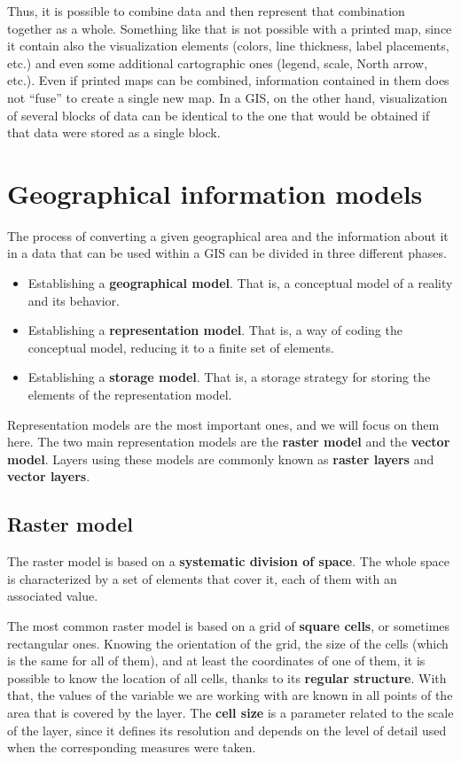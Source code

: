 Thus, it is possible to combine data and then represent that combination together as a whole. Something like that is not possible with a printed map, since it contain also the visualization elements (colors, line thickness, label placements, etc.) and even some additional cartographic ones (legend, scale, North arrow, etc.). Even if printed maps can be combined, information contained in them does not ``fuse'' to create a single new map. In a GIS, on the other hand, visualization of several blocks of data can be identical to the one that would be obtained if that data were stored as a single block.


\section{Geographical information models}

The process of converting a given geographical area and the information about it in a data that can be used within a GIS can be divided in three different phases.

\begin{itemize}
 \item Establishing a \textbf{geographical model}. That is, a conceptual model of a reality and its behavior.
\item Establishing a \textbf{representation model}. That is, a way of coding the conceptual model, reducing it to a finite set of elements.
\item Establishing a \textbf{storage model}. That is, a storage strategy for storing the elements of the representation model.
\end{itemize}

Representation models are the most important ones, and we will focus on them here. The two main representation models are the \textbf{raster model} and the \textbf{vector model}. Layers using these models are commonly known as \textbf{raster layers} and \textbf{vector layers}.

\subsection{Raster model}

The raster model is based on a \textbf{systematic division of space}. The whole space is characterized by a set of elements that cover it, each of them with an associated value.

The most common raster model is based on a grid of \textbf{square cells}, or sometimes rectangular ones. Knowing the orientation of the grid, the size of  the cells (which is the same for all of them), and at least the coordinates of one of them, it is possible to know the location of all cells, thanks to its \textbf{regular structure}. With that, the values of the variable we are working with are known in all points of the area that is covered by the layer. The \textbf{cell size} is a parameter related to the scale of the layer, since it defines its resolution and depends on the level of detail used when the corresponding measures were taken.

